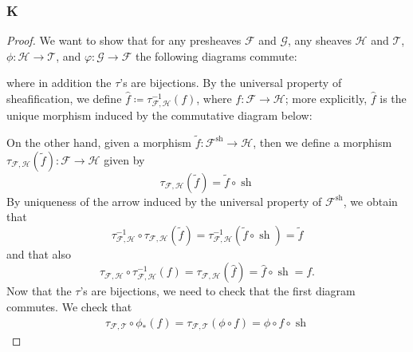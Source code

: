 \documentclass{article}
\newcommand{\fF}{\mathscr{F}}
\newcommand{\fG}{\mathscr{G}}
\newcommand{\fH}{\mathscr{H}}
\newcommand{\fT}{\mathscr{T}}
\DeclareMathOperator{\Hom}{\mathrm{Hom}}
\DeclareMathOperator{\sh}{sh}
\begin{document}
\subsubsection{K}\label{2.4.K}
\begin{proof}
    We want to show that for any presheaves $\fF$ and $\fG$, any sheaves $\fH$ and $\fT$, $\phi:\fH\to \fT$, and $\varphi:\fG \to \fF$ the following diagrams commute:
    \begin{center}
    \end{center}
    where in addition the $\tau$'s are bijections. By the universal property of sheafification, we define $\hat f\coloneqq \tau_{\fF,\fH}^{-1}(f)$, where $f:\fF\to \fH$; more explicitly, $\hat f$ is the unique morphism induced by the commutative diagram below:
    \begin{center}
    \end{center}
    On the other hand, given a morphism $\tilde f:\fF^{\sh}\to \fH$, then we define a morphism $\tau_{\fF,\fH}(\tilde f):\fF\to \fH$ given by 
    \[
    \tau_{\fF,\fH}(\tilde f)=\tilde f\circ \sh
    \]
    By uniqueness of the arrow induced by the universal property of $\fF^{\sh}$, we obtain that 
    \[
    \tau_{\fF,\fH}^{-1}\circ \tau_{\fF,\fH}(\tilde f)=\tau_{\fF,\fH}^{-1}(\tilde f\circ \sh)=\tilde f
    \]
    and that also
    \[
    \tau_{\fF,\fH}\circ \tau_{\fF,\fH}^{-1}(f)=\tau_{\fF,\fH}(\hat f)=\hat f\circ \sh=f.
    \]
    Now that the $\tau$'s are bijections, we need to check that the first diagram commutes. We check that
    \begin{align*}
        \tau_{\fF,\fT}\circ \phi_*(f)=\tau_{\fF,\fT}(\phi\circ f)=\phi\circ f\circ \sh

\end{align*}
\end{proof}
\end{document}
